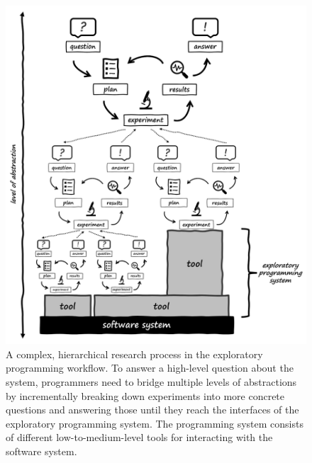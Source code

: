 \begin{figure}
	\centering
	\includegraphics[width=\textwidth]{01_exp/complex_process.png}
	\caption[A \emph{hierarchical research process} in the exploratory programming workflow.]{
		A complex, hierarchical research process in the exploratory programming workflow.
		To answer a high-level question about the system, programmers need to bridge multiple levels of abstractions by incrementally breaking down experiments into more concrete questions and answering those until they reach the interfaces of the exploratory programming system.
		The programming system consists of different low-to-medium-level tools for interacting with the software system.
	}
	\label{fig:background/exp/complex_process}
\end{figure}

